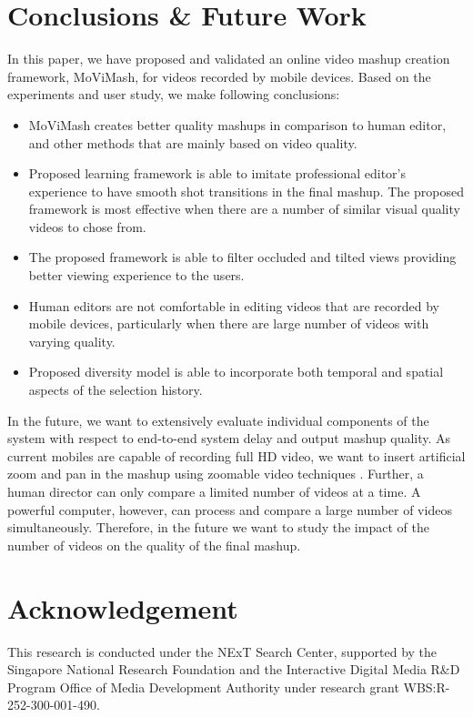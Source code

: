 \documentclass{sig-alternate}
\providecommand{\DIFadd}[1]{{\protect\color{blue}\uwave{#1}}} %
\providecommand{\DIFaddbegin}{} %
\providecommand{\DIFaddend}{} %
\begin{document}
\section{ Conclusions \& Future Work}\label{future}
\DIFaddbegin \DIFadd{Finally, I have added all the sentences.
}\DIFaddend In this paper, we have proposed and validated an online video
mashup creation framework, MoViMash, for videos recorded by mobile devices. Based on the experiments and user study, we make following conclusions:
 \begin{itemize} 
    \item MoViMash creates better quality mashups in comparison to human editor, and other methods that are mainly based on video quality.
    \item Proposed learning framework is able to imitate professional editor\textquoteright s experience to have smooth shot transitions in the final mashup. The proposed framework is most effective when there are a number of similar visual quality videos to chose from.
    \item The proposed framework is able to filter occluded and tilted views providing better viewing experience to the users.
    \item Human editors are not comfortable in editing videos that are recorded by mobile devices, particularly when there are large number of videos with varying quality.
    \item Proposed diversity model is able to incorporate both temporal and spatial aspects of the selection history.
 \end{itemize} 
In the future, we want to extensively evaluate individual components of the system with respect to end-to-end system delay and output mashup quality. As current mobiles are capable of recording full HD video, we want to insert artificial zoom and pan in the mashup using zoomable video techniques \cite{11}. Further, a human director can only compare a limited number of videos at a time. A powerful computer, however, can process and compare a large number of videos simultaneously. Therefore, in the future we want to study the impact of the number of videos on the quality of the final mashup.

\section*{Acknowledgement}
This research is conducted under the NExT Search Center, supported
by the Singapore National Research Foundation and the Interactive
Digital Media R\&D Program Office of Media Development Authority under research grant WBS:R-252-300-001-490.
\end{document}
